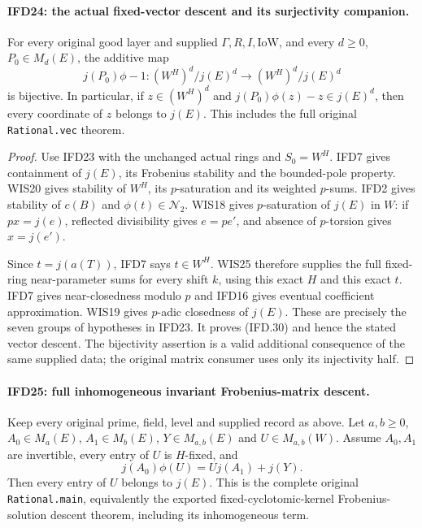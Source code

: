 \paragraph{IFD24: the actual fixed-vector descent and its surjectivity companion.}
\label{claim:IFD24}
For every original good layer and supplied $\Gamma,R,I,\mathrm{IoW}$,
and every $d\geq0$, $P_0\in M_d(E)$, the additive map
\[
              j(P_0)\phi-1:(W^H)^d/j(E)^d
                                      \longrightarrow(W^H)^d/j(E)^d
                                                               \tag{IFD.30}
\]
is bijective. In particular, if $z\in(W^H)^d$ and
$j(P_0)\phi(z)-z\in j(E)^d$, then every coordinate of $z$
belongs to $j(E)$. This includes the full original
\texttt{Rational.vec} theorem.

\begin{proof}
Use IFD23 with the unchanged actual rings and $S_0=W^H$.
IFD7 gives containment of $j(E)$, its Frobenius stability and
the bounded-pole property. WIS20 gives stability of $W^H$,
its $p$-saturation and its weighted $p$-sums.
IFD2 gives stability of $c(B)$ and $\phi(t)\in\mathcal N_2$.
WIS18 gives $p$-saturation of $j(E)$ in $W$: if $px=j(e)$,
reflected divisibility gives $e=pe'$, and absence of $p$-torsion
gives $x=j(e')$.

Since $t=j(a(T))$, IFD7 says $t\in W^H$.
WIS25 therefore supplies the full fixed-ring near-parameter sums
for every shift $k$, using this exact $H$ and this exact $t$.
IFD7 gives near-closedness modulo $p$ and IFD16 gives eventual
coefficient approximation. WIS19 gives $p$-adic closedness of
$j(E)$. These are precisely the seven groups of hypotheses in
IFD23. It proves (IFD.30) and hence the stated vector descent.
The bijectivity assertion is a valid additional consequence of the
same supplied data; the original matrix consumer uses only its
injectivity half.
\end{proof}

\paragraph{IFD25: full inhomogeneous invariant Frobenius-matrix descent.}
\label{claim:IFD25}
Keep every original prime, field, level and supplied record as above.
Let $a,b\geq0$, $A_0\in M_a(E)$, $A_1\in M_b(E)$,
$Y\in M_{a,b}(E)$ and $U\in M_{a,b}(W)$.
Assume $A_0,A_1$ are invertible, every entry of $U$ is $H$-fixed,
and
\[
                        j(A_0)\phi(U)=Uj(A_1)+j(Y).         \tag{IFD.31}
\]
Then every entry of $U$ belongs to $j(E)$.
This is the complete original \texttt{Rational.main}, equivalently
the exported fixed-cyclotomic-kernel Frobenius-solution descent
theorem, including its inhomogeneous term.

